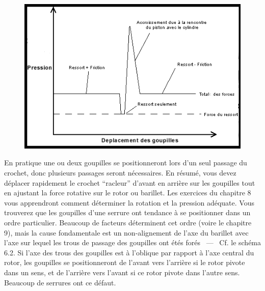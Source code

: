 \documentclass[a4paper,french,11pt,twoside]{report}
\begin{document}
\begin{figure}[h] \begin{center}
        \includegraphics[scale=0.7]{images/Image13}
        \caption{}
\end{center} \end{figure}

En pratique une ou deux goupilles se positionneront lors d'un seul passage du crochet, donc plusieurs passages seront nécessaires. En résumé, vous devez déplacer rapidement le crochet \enquote{racleur} d'avant en arrière sur les goupilles tout en ajustant la force rotative sur le rotor ou barillet. Les exercices du chapitre 8 vous apprendront comment déterminer la rotation et la pression adéquate. Vous trouverez que les goupilles d'une serrure ont tendance à se positionner dans un ordre particulier. Beaucoup de facteurs déterminent cet ordre (voire le chapitre 9), mais la cause fondamentale est un non-alignement de l'axe du barillet avec l'axe sur lequel les trous de passage des goupilles ont étés forés ~---~ Cf. le schéma 6.2. Si l'axe des trous des goupilles est à l'oblique par rapport à l'axe central du rotor, les goupilles se positionneront de l'avant vers l'arrière si le rotor pivote dans un sens, et de l'arrière vers l'avant si ce rotor pivote dans l'autre sens. Beaucoup de serrures ont ce défaut.
\end{document}
